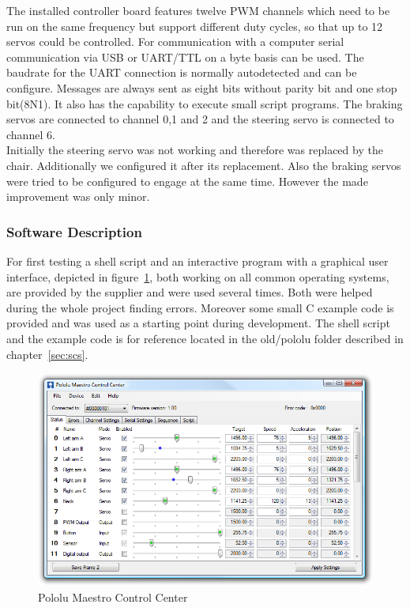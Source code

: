 The installed controller board features twelve PWM channels which need to be run on the same frequency but support different duty cycles, so that up to 12 servos could be controlled. For communication with a computer serial communication via USB or UART/TTL on a byte basis can be used. The baudrate for the UART connection is normally autodetected and can be configure. Messages are always sent as eight bits without parity bit and one stop bit(8N1). It also has the capability to execute small script programs. The braking servos are connected to channel 0,1 and 2 and the steering servo is connected to channel 6.\\

Initially the steering servo was not working and therefore was replaced by the chair. Additionally we configured it after its replacement. Also the braking servos were tried to be configured to engage at the same time. However the made improvement was only minor.

\subsubsection{Software Description}
For first testing a shell script and an interactive program with a graphical user interface, depicted in figure~\ref{fig:controlcenter}, both working on all common operating systems, are provided by the supplier and were used several times. Both were helped during the whole project finding errors. Moreover some small C example code is provided and was used as a starting point during development. The shell script and the example code is for reference located in the old/pololu folder described in chapter~\ref{sec:scs}.\\

\begin{figure}[h!tb]
	\centering
    \includegraphics[width=\linewidth]{images/pololucontrolcenter}
    \caption{Pololu Maestro Control Center}
    \label{fig:controlcenter}
\end{figure}

